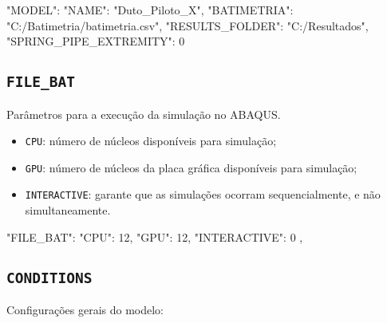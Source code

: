 \begin{jsoncode}
{
  "MODEL": {
    "NAME": "Duto_Piloto_X",
    "BATIMETRIA": "C:/Batimetria/batimetria.csv",
    "RESULTS_FOLDER": "C:/Resultados",
    "SPRING_PIPE_EXTREMITY": 0
  }
}
\end{jsoncode}

\subsection{\texttt{FILE\_BAT}}

Parâmetros para a execução da simulação no ABAQUS.

\begin{itemize}
  \item \texttt{CPU}: número de núcleos disponíveis para simulação;
  \item \texttt{GPU}: número de núcleos da placa gráfica disponíveis para simulação;
  \item \texttt{INTERACTIVE}: garante que as simulações ocorram sequencialmente, e não simultaneamente.
\end{itemize}

\begin{jsoncode}
{
  "FILE_BAT": {
    "CPU": 12,
    "GPU": 12,
    "INTERACTIVE": 0
  },
}
\end{jsoncode}

\subsection{\texttt{CONDITIONS}}

Configurações gerais do modelo:

